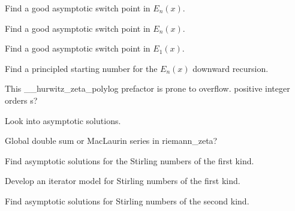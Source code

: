 \begin{DoxyRefList}
Find a good asymptotic switch point in $ E_n(x) $. 

Find a good asymptotic switch point in $ E_n(x) $.  
\item[\label{todo__todo000010}%
\Hypertarget{todo__todo000010}%
Member \hyperlink{namespacestd_1_1____detail_a665eb0c524b929c035d88bbb17815917}{std\+:\+:\+\_\+\+\_\+detail\+:\+:\+\_\+\+\_\+expint\+\_\+\+E1} (\+\_\+\+Tp \+\_\+\+\_\+x)]Find a good asymptotic switch point in $ E_1(x) $.  
\item[\label{todo__todo000009}%
\Hypertarget{todo__todo000009}%
Member \hyperlink{namespacestd_1_1____detail_a9b0a2050324390fb6c4a584170289a99}{std\+:\+:\+\_\+\+\_\+detail\+:\+:\+\_\+\+\_\+expint\+\_\+\+En\+\_\+recursion} (unsigned int \+\_\+\+\_\+n, \+\_\+\+Tp \+\_\+\+\_\+x)]Find a principled starting number for the $ E_n(x) $ downward recursion.  
\item[\label{todo__todo000013}%
\Hypertarget{todo__todo000013}%
Member \hyperlink{namespacestd_1_1____detail_a7c45415c3ec0e137eea2364a6dd3af4e}{std\+:\+:\+\_\+\+\_\+detail\+:\+:\+\_\+\+\_\+hurwitz\+\_\+zeta\+\_\+polylog} (\+\_\+\+Tp \+\_\+\+\_\+s, std\+::complex$<$ \+\_\+\+Tp $>$ \+\_\+\+\_\+a)]This \+\_\+\+\_\+hurwitz\+\_\+zeta\+\_\+polylog prefactor is prone to overflow. positive integer orders s?  
\item[\label{todo__todo000016}%
\Hypertarget{todo__todo000016}%
Member \hyperlink{namespacestd_1_1____detail_a7ba1fde0547236676d579b6405f2fb25}{std\+:\+:\+\_\+\+\_\+detail\+:\+:\+\_\+\+\_\+log\+\_\+stirling\+\_\+2} (unsigned int \+\_\+\+\_\+n, unsigned int \+\_\+\+\_\+m)]Look into asymptotic solutions.  
\item[\label{todo__todo000018}%
\Hypertarget{todo__todo000018}%
Member \hyperlink{namespacestd_1_1____detail_a2be77d9bdd1b8b463be44a0e7558bc2a}{std\+:\+:\+\_\+\+\_\+detail\+:\+:\+\_\+\+\_\+riemann\+\_\+zeta} (\+\_\+\+Tp \+\_\+\+\_\+s)]Global double sum or Mac\+Laurin series in riemann\+\_\+zeta?  
\item[\label{todo__todo000017}%
\Hypertarget{todo__todo000017}%
Member \hyperlink{namespacestd_1_1____detail_a8b215e4ca28ec9b7b078d7f3d9aecc17}{std\+:\+:\+\_\+\+\_\+detail\+:\+:\+\_\+\+\_\+stirling\+\_\+1} (unsigned int \+\_\+\+\_\+n, unsigned int \+\_\+\+\_\+m)]Find asymptotic solutions for the Stirling numbers of the first kind. 

Develop an iterator model for Stirling numbers of the first kind.  
\item[\label{todo__todo000015}%
\Hypertarget{todo__todo000015}%
Member \hyperlink{namespacestd_1_1____detail_a4589d459a7a9d1d9e19b33601238a4af}{std\+:\+:\+\_\+\+\_\+detail\+:\+:\+\_\+\+\_\+stirling\+\_\+2} (unsigned int \+\_\+\+\_\+n, unsigned int \+\_\+\+\_\+m)]Find asymptotic solutions for Stirling numbers of the second kind. 


\end{DoxyRefList}
